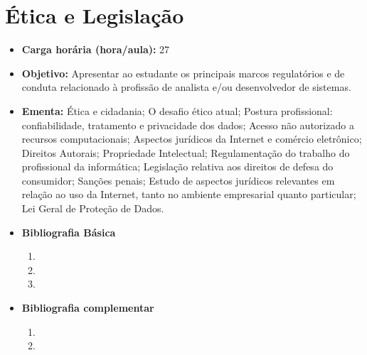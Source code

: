 \documentclass[
	10pt,				%
	openright,			%
	twoside,			%
	a4paper,			%
	english,			%
	french,				%
	brazil,				%
	sumario=tradicional
]{abntex2}
\begin{document}
\section*{Ética e Legislação}\label{5_etica}
\begin{itemize}
	\item \textbf{Carga horária (hora/aula):} 27
	\item \textbf{Objetivo:} Apresentar ao estudante os principais marcos regulatórios e de conduta relacionado à profissão de analista e/ou desenvolvedor de sistemas.
	\item \textbf{Ementa:}
	Ética e cidadania;
	O desafio ético atual;
	Postura profissional: confiabilidade, tratamento e privacidade dos dados;
	Acesso não autorizado a recursos computacionais;
	Aspectos jurídicos da Internet e comércio eletrônico; 
	Direitos Autorais;
	Propriedade Intelectual;
	Regulamentação do trabalho do profissional da informática;
	Legislação relativa aos direitos de defesa do consumidor;
	Sanções penais;
	Estudo de aspectos jurídicos relevantes em relação ao uso da Internet, tanto no ambiente empresarial quanto particular;
	Lei Geral de Proteção de Dados.
	\item \textbf{Bibliografia Básica}
	\begin{enumerate}
		\item%
		\item 
		\item 
	\end{enumerate}
	\item \textbf{Bibliografia complementar}
	\begin{enumerate}
		\item 
		\item
	\end{enumerate} 	
\end{itemize}

\newpage
\end{document}
